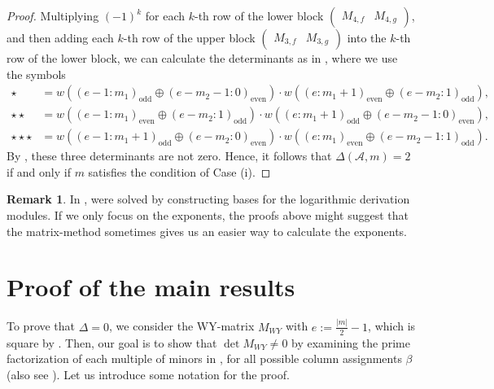 \documentclass[12pt]{amsart}
\theoremstyle{definition}
\newtheorem{remark}[definition]{Remark}
\newcommand{\NN}{\mathbb{N}}
\newcommand{\ZZ}{\mathbb{Z}}
\newcommand{\AAA}{\mathcal{A}}
\newcommand{\cevxx}[2]{\begin{pmatrix}#1&#2\end{pmatrix}}
\begin{document}
\begin{proof}
Multiplying $(-1)^k$ for each $k$-th row of the lower block $\cevxx{M_{4,f}}{M_{4,g}}$, 
and then adding each $k$-th row of the upper block $\cevxx{M_{3,f}}{M_{3,g}}$ 
into the $k$-th row of the lower block, we can calculate the determinants as in , 
where we use the symbols 
\begin{align*}
    \star &= 
     w((e-1:m_1)_{\text{odd}}\oplus(e-m_2-1:0)_{\text{even}})\cdot 
    w((e:m_1+1)_{\text{even}}\oplus(e-m_2:1)_{\text{odd}}), \\
    \star\star &= 
    w((e-1:m_1)_{\text{even}}\oplus(e-m_2:1)_{\text{odd}})\cdot 
    w((e:m_1+1)_{\text{odd}}\oplus(e-m_2-1:0)_{\text{even}}), \\
    \star\star\star &= 
    w((e-1:m_1+1)_{\text{odd}}\oplus(e-m_2:0)_{\text{even}})\cdot 
    w((e:m_1)_{\text{even}}\oplus(e-m_2-1:1)_{\text{odd}}).
    \end{align*}
By , these three determinants are not zero. %
Hence, it follows that $\Delta(\AAA,m)=2$ if and only if $m$ satisfies the condition of Case (i). %
\end{proof}

\begin{remark}
    In \cite{Wakamiko,2312.06356}, 
    were solved by constructing bases for the logarithmic derivation modules. 
    If we only focus on the exponents, the proofs above might suggest that 
    the matrix-method sometimes gives us an easier way 
    to calculate the exponents.    
\end{remark}
\section{Proof of the main results}\label{section:proof of main theorem}
To prove that $\Delta=0$, we consider the WY-matrix $M_{WY}$ with $e:=\frac{|m|}{2}-1$, which is square by . 
Then, our goal is to show that $\det M_{WY} \neq 0$ 
by examining the prime factorization of each multiple of minors 
in , 
for all possible column assignments $\beta$ (also see ). 
Let us introduce some notation for the proof. 
\end{document}
